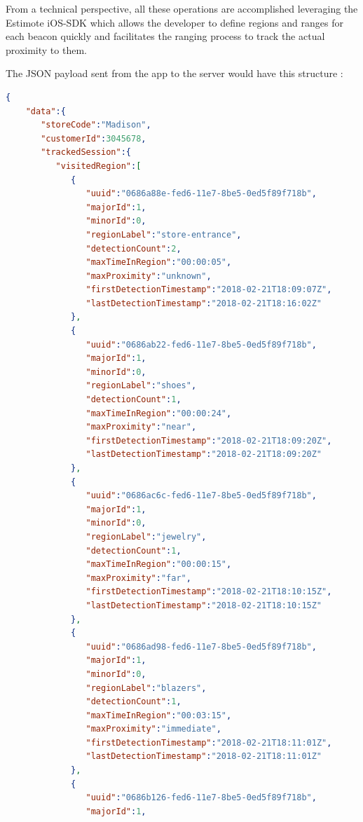 From a technical perspective, all these operations are accomplished leveraging the Estimote iOS-SDK \cite{estimote-ios-sdk} which allows the developer to define regions and ranges for each beacon quickly and facilitates the ranging process to track the actual proximity to them.

The JSON payload sent from the app to the server would have this structure :


\vspace{0.5cm}
\begin{lstlisting}[language=json,firstnumber=1]
  {
    "data":{
       "storeCode":"Madison",
       "customerId":3045678,
       "trackedSession":{
          "visitedRegion":[
             {
                "uuid":"0686a88e-fed6-11e7-8be5-0ed5f89f718b",
                "majorId":1,
                "minorId":0,
                "regionLabel":"store-entrance",
                "detectionCount":2,
                "maxTimeInRegion":"00:00:05",
                "maxProximity":"unknown",
                "firstDetectionTimestamp":"2018-02-21T18:09:07Z",
                "lastDetectionTimestamp":"2018-02-21T18:16:02Z"
             },
             {
                "uuid":"0686ab22-fed6-11e7-8be5-0ed5f89f718b",
                "majorId":1,
                "minorId":0,
                "regionLabel":"shoes",
                "detectionCount":1,
                "maxTimeInRegion":"00:00:24",
                "maxProximity":"near",
                "firstDetectionTimestamp":"2018-02-21T18:09:20Z",
                "lastDetectionTimestamp":"2018-02-21T18:09:20Z"
             },
             {
                "uuid":"0686ac6c-fed6-11e7-8be5-0ed5f89f718b",
                "majorId":1,
                "minorId":0,
                "regionLabel":"jewelry",
                "detectionCount":1,
                "maxTimeInRegion":"00:00:15",
                "maxProximity":"far",
                "firstDetectionTimestamp":"2018-02-21T18:10:15Z",
                "lastDetectionTimestamp":"2018-02-21T18:10:15Z"
             },
             {
                "uuid":"0686ad98-fed6-11e7-8be5-0ed5f89f718b",
                "majorId":1,
                "minorId":0,
                "regionLabel":"blazers",
                "detectionCount":1,
                "maxTimeInRegion":"00:03:15",
                "maxProximity":"immediate",
                "firstDetectionTimestamp":"2018-02-21T18:11:01Z",
                "lastDetectionTimestamp":"2018-02-21T18:11:01Z"
             },
             {
                "uuid":"0686b126-fed6-11e7-8be5-0ed5f89f718b",
                "majorId":1,

\end{lstlisting}
